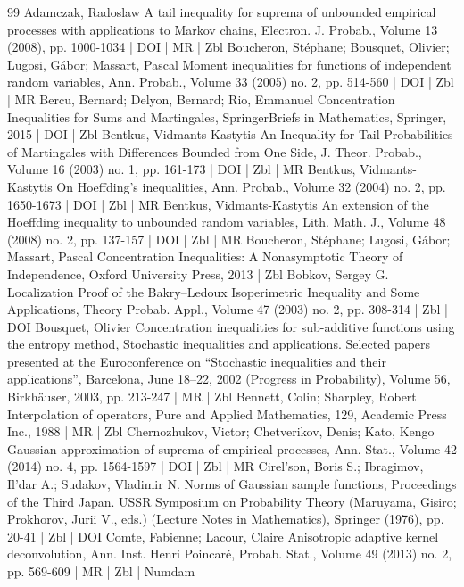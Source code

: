 \documentclass[10pt]{amsart}
\theoremstyle{definition}\newtheorem{defi}[theo]{Definition}\newtheorem{rema}[theo]{Remark}\newtheorem{exam}[theo]{Example}\newtheorem{exem}[theo]{Example}\newtheorem{nota}[theo]{Notation}
\begin{document}
\begin{thebibliography}{99}
Adamczak, Radoslaw A tail inequality for suprema of unbounded empirical processes with applications to Markov chains, Electron. J. Probab., Volume 13 (2008), pp. 1000-1034 | DOI | MR | Zbl
Boucheron, Stéphane; Bousquet, Olivier; Lugosi, Gábor; Massart, Pascal Moment inequalities for functions of independent random variables, Ann. Probab., Volume 33 (2005) no. 2, pp. 514-560 | DOI | Zbl | MR
Bercu, Bernard; Delyon, Bernard; Rio, Emmanuel Concentration Inequalities for Sums and Martingales, SpringerBriefs in Mathematics, Springer, 2015 | DOI | Zbl
Bentkus, Vidmants-Kastytis An Inequality for Tail Probabilities of Martingales with Differences Bounded from One Side, J. Theor. Probab., Volume 16 (2003) no. 1, pp. 161-173 | DOI | Zbl | MR
Bentkus, Vidmants-Kastytis On Hoeffding’s inequalities, Ann. Probab., Volume 32 (2004) no. 2, pp. 1650-1673 | DOI | Zbl | MR
Bentkus, Vidmants-Kastytis An extension of the Hoeffding inequality to unbounded random variables, Lith. Math. J., Volume 48 (2008) no. 2, pp. 137-157 | DOI | Zbl | MR
Boucheron, Stéphane; Lugosi, Gábor; Massart, Pascal Concentration Inequalities: A Nonasymptotic Theory of Independence, Oxford University Press, 2013 | Zbl
Bobkov, Sergey G. Localization Proof of the Bakry–Ledoux Isoperimetric Inequality and Some Applications, Theory Probab. Appl., Volume 47 (2003) no. 2, pp. 308-314 | Zbl | DOI
Bousquet, Olivier Concentration inequalities for sub-additive functions using the entropy method, Stochastic inequalities and applications. Selected papers presented at the Euroconference on “Stochastic inequalities and their applications”, Barcelona, June 18–22, 2002 (Progress in Probability), Volume 56, Birkhäuser, 2003, pp. 213-247 | MR | Zbl
Bennett, Colin; Sharpley, Robert Interpolation of operators, Pure and Applied Mathematics, 129, Academic Press Inc., 1988 | MR | Zbl
Chernozhukov, Victor; Chetverikov, Denis; Kato, Kengo Gaussian approximation of suprema of empirical processes, Ann. Stat., Volume 42 (2014) no. 4, pp. 1564-1597 | DOI | Zbl | MR
Cirel’son, Boris S.; Ibragimov, Il’dar A.; Sudakov, Vladimir N. Norms of Gaussian sample functions, Proceedings of the Third Japan. USSR Symposium on Probability Theory (Maruyama, Gisiro; Prokhorov, Jurii V., eds.) (Lecture Notes in Mathematics), Springer (1976), pp. 20-41 | Zbl | DOI
Comte, Fabienne; Lacour, Claire Anisotropic adaptive kernel deconvolution, Ann. Inst. Henri Poincaré, Probab. Stat., Volume 49 (2013) no. 2, pp. 569-609 | MR | Zbl | Numdam

\end{thebibliography}
\end{document}
